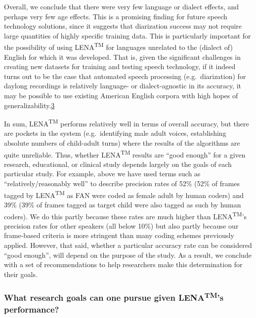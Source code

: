 \documentclass[english,floatsintext,man]{apa6}
\begin{document}
Overall, we conclude that there were very few language or dialect
effects, and perhaps very few age effects. This is a promising finding
for future speech technology solutions, since it suggests that
diarization success may not require large quantities of highly specific
training data. This is particularly important for the possibility of
using LENA\textsuperscript{TM} for languages unrelated to the (dialect
of) English for which it was developed. That is, given the significant
challenges in creating new datasets for training and testing speech
technology, if it indeed turns out to be the case that automated speech
processing (e.g.~diarization) for daylong recordings is relatively
language- or dialect-agnostic in its accuracy, it may be possible to use
existing American English corpora with high hopes of
generalizability.\href{To\%20be\%20clear,\%20given\%20that\%20we\%20were\%20unable\%20to\%20computer\%20AWC\%20for\%20Tsimane',\%20we\%20are\%20only\%20able\%20to\%20speak\%20to\%20generalizability\%20across\%20samples\%20and\%20dialects\%20of\%20English\%20for\%20that\%20metric}{3}

In sum, LENA\textsuperscript{TM} performs relatively well in terms of
overall accuracy, but there are pockets in the system (e.g.~identifying
male adult voices, establishing absolute numbers of child-adult turns)
where the results of the algorithms are quite unreliable. Thus, whether
LENA\textsuperscript{TM} results are \enquote{good enough} for a given
research, educational, or clinical study depends largely on the goals of
each particular study. For example, above we have used terms such as
\enquote{relatively/reasonably well} to describe precision rates of 52\%
(52\% of frames tagged by LENA\textsuperscript{TM} as FAN were coded as
female adult by human coders) and 39\% (39\% of frames tagged as target
child were also tagged as such by human coders). We do this partly
because these rates are much higher than LENA\textsuperscript{TM}'s
precision rates for other speakers (all below 10\%) but also partly
because our frame-based criteria is more stringent than many coding
schemes previously applied. However, that said, whether a particular
accuracy rate can be considered \enquote{good enough}, will depend on
the purpose of the study. As a result, we conclude with a set of
recommendations to help researchers make this determination for their
goals.

\subsubsection{\texorpdfstring{What research goals can one pursue given
LENA\textsuperscript{TM}'s
performance?}{What research goals can one pursue given LENATM's performance?}}\label{what-research-goals-can-one-pursue-given-lenatms-performance}
\end{document}
